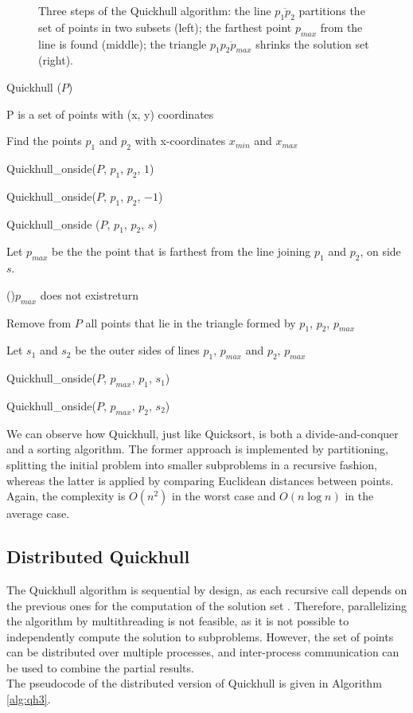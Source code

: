 \documentclass[]{finalproject}
\begin{document}
\begin{figure}[H]
\begin{minipage}{.33\linewidth}
	\end{minipage}
    \caption{Three steps of the Quickhull algorithm: the line $\overline{p_1p_2}$ partitions the set of points in two subsets (left); the farthest point $p_{max}$ from the line is found (middle); the triangle $\overline{p_1p_2p_{max}}$ shrinks the solution set (right).}
    \label{fig:qh-steps}
\end{figure}

\begin{algorithm}
    \caption{Quickhull ($P$)}
    \label{alg:qh1}
    P is a set of points with (x, y) coordinates

    Find the points $p_1$ and $p_2$ with x-coordinates $x_{min}$ and $x_{max}$

    Quickhull\_onside($P$, $p_1$, $p_2$, $1$)

    Quickhull\_onside($P$, $p_1$, $p_2$, $-1$)
\end{algorithm}
\begin{algorithm}
  \caption{Quickhull\_onside ($P$, $p_1$, $p_2$, $s$)}
  \label{alg:qh2}
  Let $p_{max}$ be the the point that is farthest from the line joining $p_1$ and $p_2$, on side $s$.

  \If(){$p_{max}$ does not exist}{return}

  Remove from $P$ all points that lie in the triangle formed by $p_1$, $p_2$, $p_{max}$

  Let $s_1$ and $s_2$ be the outer sides of lines $p_1$, $p_{max}$ and $p_2$, $p_{max}$

  Quickhull\_onside($P$, $p_{max}$, $p_1$, $s_1$)

  Quickhull\_onside($P$, $p_{max}$, $p_2$, $s_2$)
\end{algorithm}

We can observe how Quickhull, just like Quicksort,
is both a divide-and-conquer and a sorting algorithm. The former approach is implemented by partitioning,
splitting the initial problem into smaller subproblems in a recursive fashion, whereas the latter is applied by comparing
Euclidean distances between points. Again, the complexity is $O(n^2)$ in the worst case and $O(n\log{n})$ in the average case.

\subsection{Distributed Quickhull}
The Quickhull algorithm is sequential by design,
as each recursive call depends on the previous ones for the computation of the solution set \cite{qhpaper}.
Therefore, parallelizing the algorithm by multithreading is not feasible, as it is not possible to independently compute the solution to subproblems.
However, the set of points can be distributed over multiple processes, and inter-process communication can be used to combine the partial results.\\
The pseudocode of the distributed version of Quickhull is given in Algorithm \ref{alg:qh3}.
\end{document}
